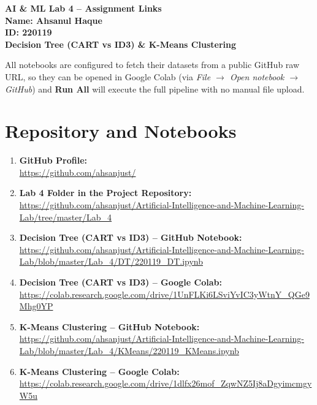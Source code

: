 \documentclass[11pt]{article}
\begin{document}
\begin{center}
    {\huge \textbf{AI \& ML Lab 4 -- Assignment Links}} \\[0.3cm]
    {\Large \textbf{Name: Ahsanul Haque}} \\[0.1cm]
    {\Large \textbf{ID: 220119}} \\[0.4cm]
    {\large \textbf{Decision Tree (CART vs ID3) \& K-Means Clustering}} \\[0.5cm]
\end{center}

\noindent All notebooks are configured to fetch their datasets from a public GitHub raw
URL, so they can be opened in Google Colab (via \emph{File $\rightarrow$ Open
notebook $\rightarrow$ GitHub}) and \textbf{Run All} will execute the full pipeline
with no manual file upload.

\section*{Repository and Notebooks}

\begin{enumerate}[leftmargin=*, itemsep=0.3cm]

    \item \textbf{GitHub Profile:} \\
    \url{https://github.com/ahsanjust/}

    \item \textbf{Lab 4 Folder in the Project Repository:} \\
    \url{https://github.com/ahsanjust/Artificial-Intelligence-and-Machine-Learning-Lab/tree/master/Lab_4}

    \item \textbf{Decision Tree (CART vs ID3) -- GitHub Notebook:} \\
    \url{https://github.com/ahsanjust/Artificial-Intelligence-and-Machine-Learning-Lab/blob/master/Lab_4/DT/220119_DT.ipynb}

    \item \textbf{Decision Tree (CART vs ID3) -- Google Colab:} \\
    \url{https://colab.research.google.com/drive/1UnFLKi6LSviYvIC3yWtnY_QGe9Mhg0YP}

    \item \textbf{K-Means Clustering -- GitHub Notebook:} \\
    \url{https://github.com/ahsanjust/Artificial-Intelligence-and-Machine-Learning-Lab/blob/master/Lab_4/KMeans/220119_KMeans.ipynb}

    \item \textbf{K-Means Clustering -- Google Colab:} \\
    \url{https://colab.research.google.com/drive/1dlfx26mof_ZqwNZ5Ij8aDgyimcmgyW5u}

\end{enumerate}
\end{document}
